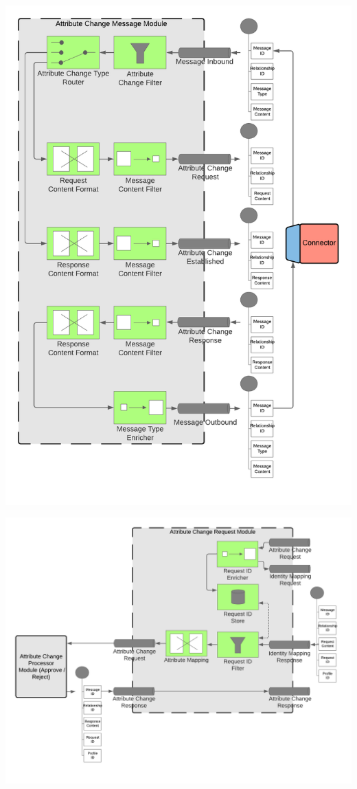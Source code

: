 \begin{center}
    \includegraphics[scale=0.6]{Diagrams/Integration Architecture 1/Technological Integration/8. Attribute Change Message Module.pdf}
\end{center}

\begin{center}
    \includegraphics[scale=0.6]{Diagrams/Integration Architecture 1/Technological Integration/9. Attribute Change Request Module.pdf}
\end{center}

